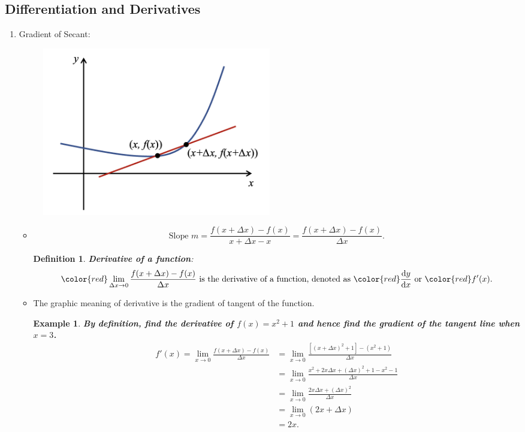 \documentclass[12pt, a4paper]{article}
\newtheorem{definition}{Definition}[subsection]
\newtheorem{example}{Example}[subsection]
\begin{document}
\subsection{Differentiation and Derivatives}
\begin{enumerate}
    \item Gradient of Secant: 
    \begin{figure}[H]
        \centering 
        \includegraphics[width=0.5\textwidth]{Fig.5.3.jpg} 
    \end{figure}
    \begin{itemize}
        \item $$\text{Slope }m=\frac{f(x+\Delta x)-f(x)}{x+\Delta x-x}=\frac{f(x+\Delta x)-f(x)}{\Delta x}.$$
        \begin{definition}
            \textbf{\color{red}Derivative of a function}: 
            $${\color{red}\lim_{\Delta x\rightarrow 0}\frac{f(x+\Delta x)-f(x)}{\Delta x}}\text{ is the derivative of a function, denoted as } {\color{red}\frac{\mathrm{d}y}{\mathrm{d}x}}\text{ or }{\color{red}f'(x)}.$$
        \end{definition}
    \item The graphic meaning of derivative is the gradient of tangent of the function. 
    \begin{example}
        \textbf{By definition, find the derivative of $f(x)=x^2+1$ and hence find the gradient of the tangent line when $x=3$.}
        $$\begin{aligned}
            f'(x)=\lim_{x\to 0}\frac{f(x+\Delta x)-f(x)}{\Delta x}&=\lim_{x\to 0}\frac{\left[(x+\Delta x)^2+1\right]-(x^2+1)}{\Delta x}\\
            &=\lim_{x\to 0}\frac{x^2+2x\Delta x+(\Delta x)^2+1-x^2-1}{\Delta x}\\
            &=\lim_{x\to 0}\frac{2x\Delta x+(\Delta x)^2}{\Delta x}\\
            &=\lim_{x\to 0}\left(2x+\Delta x\right)\\
            &=2x.
        \end{aligned}$$

\end{example}
\end{itemize}
\end{enumerate}
\end{document}
